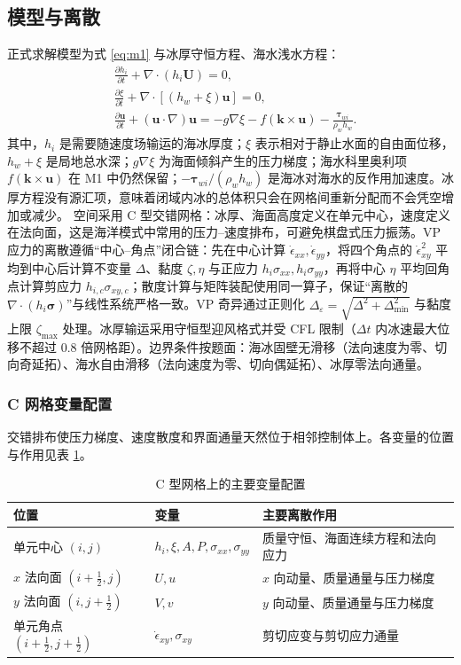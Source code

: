 \documentclass[UTF8]{ctexart}
\newcommand{\vect}[1]{\boldsymbol{#1}}
\begin{document}
\subsection{模型与离散}

正式求解模型为式 \eqref{eq:m1} 与冰厚守恒方程、海水浅水方程：
\begin{align}
&\frac{\partial h_i}{\partial t}+\nabla\cdot(h_i\vect U)=0,\\
&\frac{\partial\xi}{\partial t}+\nabla\cdot[(h_w+\xi)\vect u]=0,\\
&\frac{\partial\vect u}{\partial t}+(\vect u\cdot\nabla)\vect u
=-g\nabla\xi-f(\vect k\times\vect u)-\frac{\vect\tau_{wi}}{\rho_wh_w}.
\end{align}
其中，$h_i$ 是需要随速度场输运的海冰厚度；$\xi$ 表示相对于静止水面的自由面位移，$h_w+\xi$ 是局地总水深；$g\nabla\xi$ 为海面倾斜产生的压力梯度；海水科里奥利项 $f(\vect k\times\vect u)$ 在 M1 中仍然保留；$-\vect\tau_{wi}/(\rho_wh_w)$ 是海冰对海水的反作用加速度。冰厚方程没有源汇项，意味着闭域内冰的总体积只会在网格间重新分配而不会凭空增加或减少。
空间采用 C 型交错网格：冰厚、海面高度定义在单元中心，速度定义在法向面，这是海洋模式中常用的压力--速度排布\cite{arakawa1977}，可避免棋盘式压力振荡。VP 应力的离散遵循“中心--角点”闭合链：先在中心计算 $\dot\epsilon_{xx},\dot\epsilon_{yy}$，将四个角点的 $\dot\epsilon_{xy}^2$ 平均到中心后计算不变量 $\Delta$、黏度 $\zeta,\eta$ 与正应力 $h_i\sigma_{xx},h_i\sigma_{yy}$，再将中心 $\eta$ 平均回角点计算剪应力 $h_{i,c}\sigma_{xy,c}$；散度计算与矩阵装配使用同一算子，保证“离散的 $\nabla\cdot(h_i\vect\sigma)$”与线性系统严格一致。VP 奇异通过正则化 $\Delta_\varepsilon=\sqrt{\Delta^2+\Delta_{\min}^2}$ 与黏度上限 $\zeta_{\max}$ 处理。冰厚输运采用守恒型迎风格式并受 CFL 限制（$\Delta t$ 内冰速最大位移不超过 0.8 倍网格距）。边界条件按题面：海冰固壁无滑移（法向速度为零、切向奇延拓）、海水自由滑移（法向速度为零、切向偶延拓）、冰厚零法向通量。

\subsubsection{C 网格变量配置}

交错排布使压力梯度、速度散度和界面通量天然位于相邻控制体上。各变量的位置与作用见表 \ref{tab:cgrid}。

\begin{table}[H]
\centering
\caption{C 型网格上的主要变量配置}
\renewcommand{\arraystretch}{1.35}
\begin{tabular*}{\textwidth}{@{\extracolsep{\fill}}lll@{}}
\toprule[1pt]
位置 & 变量 & 主要离散作用\\
\midrule
单元中心 $(i,j)$ & $h_i,\xi,A,P,\sigma_{xx},\sigma_{yy}$ & 质量守恒、海面连续方程和法向应力\\
$x$ 法向面 $(i+\tfrac12,j)$ & $U,u$ & $x$ 向动量、质量通量与压力梯度\\
$y$ 法向面 $(i,j+\tfrac12)$ & $V,v$ & $y$ 向动量、质量通量与压力梯度\\
单元角点 $(i+\tfrac12,j+\tfrac12)$ & $\dot\epsilon_{xy},\sigma_{xy}$ & 剪切应变与剪切应力通量\\
\bottomrule[1pt]
\end{tabular*}
\label{tab:cgrid}
\end{table}
\end{document}
